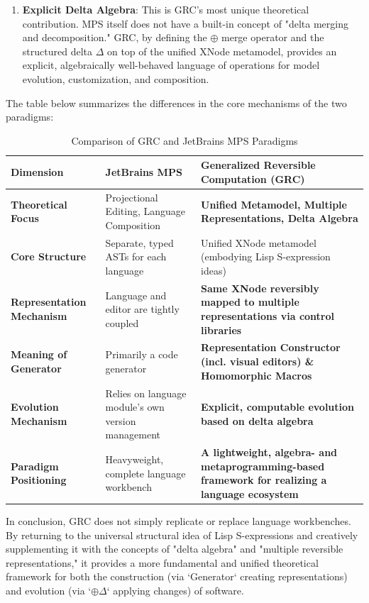 \documentclass[11pt]{article}
\begin{document}
\begin{enumerate}
    \item \textbf{Explicit Delta Algebra}: This is GRC's most unique theoretical contribution. MPS itself does not have a built-in concept of "delta merging and decomposition." GRC, by defining the $\oplus$ merge operator and the structured delta $\Delta$ on top of the unified XNode metamodel, provides an explicit, algebraically well-behaved language of operations for model evolution, customization, and composition.
\end{enumerate}

The table below summarizes the differences in the core mechanisms of the two paradigms:

\begin{table}[htbp]
\centering
\caption{Comparison of GRC and JetBrains MPS Paradigms}
\begin{tabularx}{\textwidth}{@{} X X X @{}}
\toprule
\textbf{Dimension} & \textbf{JetBrains MPS} & \textbf{Generalized Reversible Computation (GRC)} \\
\midrule
\textbf{Theoretical Focus} & Projectional Editing, Language Composition & \textbf{Unified Metamodel, Multiple Representations, Delta Algebra} \\
\addlinespace
\textbf{Core Structure} & Separate, typed ASTs for each language & Unified XNode metamodel (embodying Lisp S-expression ideas) \\
\addlinespace
\textbf{Representation Mechanism} & Language and editor are tightly coupled & \textbf{Same XNode reversibly mapped to multiple representations via control libraries} \\
\addlinespace
\textbf{Meaning of Generator} & Primarily a code generator & \textbf{Representation Constructor (incl. visual editors) \& Homomorphic Macros} \\
\addlinespace
\textbf{Evolution Mechanism} & Relies on language module's own version management & \textbf{Explicit, computable evolution based on delta algebra} \\
\addlinespace
\textbf{Paradigm Positioning} & Heavyweight, complete language workbench & \textbf{A lightweight, algebra- and metaprogramming-based framework for realizing a language ecosystem} \\
\bottomrule
\end{tabularx}
\end{table}

In conclusion, GRC does not simply replicate or replace language workbenches. By returning to the universal structural idea of Lisp S-expressions and creatively supplementing it with the concepts of "delta algebra" and "multiple reversible representations," it provides a more fundamental and unified theoretical framework for both the construction (via `Generator` creating representations) and evolution (via `$\oplus \Delta$` applying changes) of software.
\end{document}
